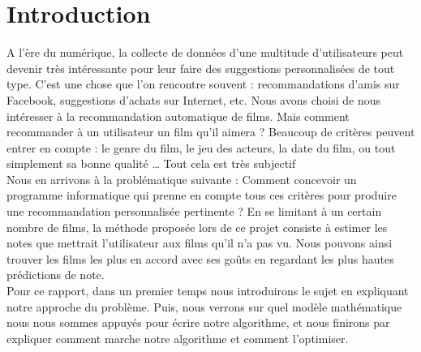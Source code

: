 \documentclass[a4paper,10pt]{article}
\title{}
\author{}
\begin{document}
\maketitle


\section*{Introduction}
A l’ère du numérique, la collecte de données d’une multitude d’utilisateurs peut devenir très intéressante pour leur faire des suggestions 
personnalisées de tout type. C’est une chose que l’on rencontre souvent : recommandations d’amis sur Facebook, suggestions d’achats sur Internet, etc.
Nous avons choisi de nous intéresser à la recommandation automatique de films.
Mais comment recommander à un utilisateur un film qu’il aimera ? Beaucoup de critères peuvent entrer en compte : 
le genre du film, le jeu des acteurs, la date du film, ou tout simplement sa bonne qualité … Tout cela est très subjectif \! \\


Nous en arrivons à la problématique suivante : Comment concevoir un programme informatique 
qui prenne en compte tous ces critères pour produire une recommandation personnalisée pertinente ?
En se limitant à un certain nombre de films, la méthode proposée lors de ce projet consiste à estimer les notes que mettrait l’utilisateur aux films qu'il n'a pas vu.
Nous pouvons ainsi trouver les films les plus en accord avec ses goûts en regardant les plus hautes prédictions de note.\\
Pour ce rapport, dans un premier temps nous introduirons le sujet en expliquant notre approche du problème.
Puis, nous verrons sur quel modèle mathématique nous nous sommes appuyés pour écrire notre algorithme, et nous finirons par expliquer comment marche notre algorithme et comment l’optimiser.
\end{document}
